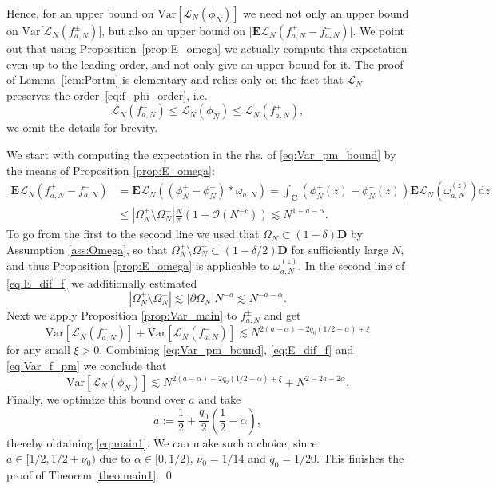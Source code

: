 \documentclass[10pt]{amsart}
\numberwithin{equation}{section}
\newcommand{\dif}{\mathrm{d}}
\newcommand{\E}{\mathbf{E}}
\newcommand{\C}{\mathbf{C}}
\newcommand{\Var}{\mathrm{Var}}
\newcommand{\Lin}{\mathcal{L}}
\begin{document}
Hence, for an upper bound on $\Var \left[\mathcal{L}_N(\phi_N)\right]$ we need not only an upper bound on $\Var \big[\mathcal{L}_N(f_{a,N}^\pm)\big]$, but also an upper bound on $\big| \E\mathcal{L}_N(f_{a,N}^+-f_{a,N}^-)\big|$. We point out that using Proposition~\ref{prop:E_omega} we actually compute this expectation even up to the leading order, and not only give an upper bound for it. The proof of Lemma~\ref{lem:Portm} is elementary and relies only on the fact that $\Lin_N$ preserves the order~\eqref{eq:f_phi_order}, i.e.
\begin{equation*}
\Lin_N(f_{a,N}^-)\le \Lin_N(\phi_N)\le \Lin_N(f_{a,N}^+),
\end{equation*}
we omit the details for brevity.

We start with computing the expectation in the rhs. of \eqref{eq:Var_pm_bound} by the means of Proposition \ref{prop:E_omega}:
\begin{equation}
\begin{split}
\E \Lin_N(f_{a,N}^+-f_{a,N}^-) &= \E\Lin_N ((\phi_N^+-\phi_N^-)*\omega_{a,N}) = \int_{\C} \left(\phi_N^+(z)-\phi_N^-(z)\right)\E\Lin_N (\omega^{(z)}_{a,N})\dif z\\
&\le |\Omega_N^+\setminus\Omega_N^-| \frac{N}{\pi} \left(1+\mathcal{O}(N^{-c})\right) \lesssim N^{1-a-\alpha}.
\end{split}
\label{eq:E_dif_f}
\end{equation}
To go from the first to the second line we used that $\Omega_N\subset (1-\delta)\mathbf{D}$ by Assumption \ref{ass:Omega}, so that $\Omega_N^+\setminus\Omega_N^-\subset (1-\delta/2)\mathbf{D}$ for sufficiently large $N$, and thus Proposition \ref{prop:E_omega} is applicable to $\omega^{(z)}_{a,N}$. In the second line of \eqref{eq:E_dif_f} we additionally estimated
\begin{equation*}
|\Omega_N^+\setminus\Omega_N^-|\lesssim |\partial\Omega_N|N^{-a}\lesssim N^{-a-\alpha}.
\end{equation*}
Next we apply Proposition \ref{prop:Var_main} to $f_{a,N}^\pm$ and get
\begin{equation}
\Var \left[\mathcal{L}_N(f_{a,N}^+)\right] + \Var \left[\mathcal{L}_N(f_{a,N}^-)\right]\lesssim N^{2(a-\alpha)-2q_0(1/2-\alpha)+\xi}
\label{eq:Var_f_pm}
\end{equation}
for any small $\xi>0$. Combining \eqref{eq:Var_pm_bound}, \eqref{eq:E_dif_f} and \eqref{eq:Var_f_pm} we conclude that
\begin{equation}
\Var \left[\mathcal{L}_N(\phi_N)\right] \lesssim N^{2(a-\alpha)-2q_0(1/2-\alpha)+\xi} + N^{2-2a-2\alpha}.
\end{equation}
Finally, we optimize this bound over $a$ and take
\begin{equation}
a:=\frac{1}{2} + \frac{q_0}{2}\left(\frac{1}{2}-\alpha\right),
\label{eq:complex_a}
\end{equation}
thereby obtaining \eqref{eq:main1}. We can make such a choice, since $a\in [1/2,1/2+\nu_0)$ due to $\alpha\in[0,1/2)$, $\nu_0=1/14$ and $q_0=1/20$. This finishes the proof of Theorem \ref{theo:main1}. \qed
\end{document}
